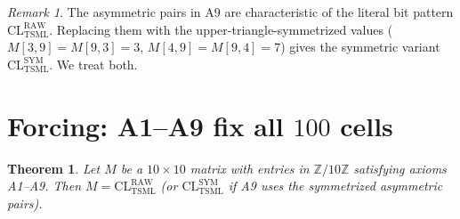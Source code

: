 \documentclass[11pt,reqno]{amsart}
\theoremstyle{plain}
\newtheorem{theorem}{Theorem}[section]
\theoremstyle{definition}
\theoremstyle{remark}
\newtheorem*{remark}{Remark}
\newcommand{\Z}{\mathbb{Z}}
\newcommand{\TSML}{\mathrm{TSML}}
\begin{document}
\begin{remark}
The asymmetric pairs in A9 are characteristic of the literal bit
pattern $\mathrm{CL}_\TSML^{\text{RAW}}$. Replacing them with the
upper-triangle-symmetrized values
($M[3,9] = M[9,3] = 3$, $M[4,9] = M[9,4] = 7$) gives the
symmetric variant $\mathrm{CL}_\TSML^{\text{SYM}}$. We treat both.
\end{remark}

\section{Forcing: A1--A9 fix all $100$ cells}
\label{sec:forcing}

\begin{theorem}\label{thm:main}
Let $M$ be a $10 \times 10$ matrix with entries in $\Z/10\Z$
satisfying axioms A1--A9. Then $M = \mathrm{CL}_\TSML^{\mathrm{RAW}}$
(or $\mathrm{CL}_\TSML^{\mathrm{SYM}}$ if A9 uses the symmetrized
asymmetric pairs).
\end{theorem}
\end{document}
